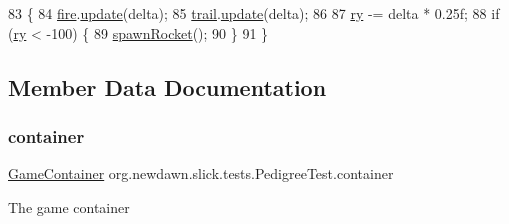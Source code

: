 \begin{DoxyCode}
83                                                            \{
84         \mbox{\hyperlink{classorg_1_1newdawn_1_1slick_1_1tests_1_1_pedigree_test_a357e9f5bc41de79c98bb219355467638}{fire}}.\mbox{\hyperlink{classorg_1_1newdawn_1_1slick_1_1particles_1_1_particle_system_a1331df1f902b7c6777b19dc798fbba80}{update}}(delta);
85         \mbox{\hyperlink{classorg_1_1newdawn_1_1slick_1_1tests_1_1_pedigree_test_ac8fed7baa305c06ec8168b5947d3c2c8}{trail}}.\mbox{\hyperlink{classorg_1_1newdawn_1_1slick_1_1particles_1_1_particle_system_a1331df1f902b7c6777b19dc798fbba80}{update}}(delta);
86         
87         \mbox{\hyperlink{classorg_1_1newdawn_1_1slick_1_1tests_1_1_pedigree_test_aa147061226924390ee1ee625aaa7674a}{ry}} -= delta * 0.25f;
88         \textcolor{keywordflow}{if} (\mbox{\hyperlink{classorg_1_1newdawn_1_1slick_1_1tests_1_1_pedigree_test_aa147061226924390ee1ee625aaa7674a}{ry}} < -100) \{
89             \mbox{\hyperlink{classorg_1_1newdawn_1_1slick_1_1tests_1_1_pedigree_test_a007e9eeb102e627c99150fb945f41b5d}{spawnRocket}}();
90         \}
91     \}
\end{DoxyCode}


\subsection{Member Data Documentation}
\mbox{\label{classorg_1_1newdawn_1_1slick_1_1tests_1_1_pedigree_test_a803d53a8e6fe77152a4710313def6132}} 
\subsubsection{\texorpdfstring{container}{container}}
{\footnotesize\ttfamily \mbox{\hyperlink{classorg_1_1newdawn_1_1slick_1_1_game_container}{Game\+Container}} org.\+newdawn.\+slick.\+tests.\+Pedigree\+Test.\+container\hspace{0.3cm}{\ttfamily [private]}}

The game container \mbox{\label{classorg_1_1newdawn_1_1slick_1_1tests_1_1_pedigree_test_a357e9f5bc41de79c98bb219355467638}} 
